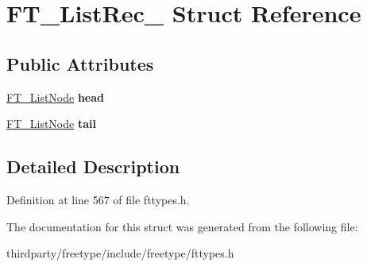 \hypertarget{struct_f_t___list_rec__}{}\section{F\+T\+\_\+\+List\+Rec\+\_\+ Struct Reference}
\label{struct_f_t___list_rec__}
\subsection*{Public Attributes}
\begin{DoxyCompactItemize}
\item 
\mbox{\label{struct_f_t___list_rec___a09ed35c2bcdc1c3acd12ff4650dfdeb9}} 
\hyperlink{struct_f_t___list_node_rec__}{F\+T\+\_\+\+List\+Node} {\bfseries head}
\item 
\mbox{\label{struct_f_t___list_rec___a4664761f0ab2af3d48231b00cd978b23}} 
\hyperlink{struct_f_t___list_node_rec__}{F\+T\+\_\+\+List\+Node} {\bfseries tail}
\end{DoxyCompactItemize}


\subsection{Detailed Description}


Definition at line 567 of file fttypes.\+h.



The documentation for this struct was generated from the following file\+:\begin{DoxyCompactItemize}
\item 
thirdparty/freetype/include/freetype/fttypes.\+h\end{DoxyCompactItemize}
